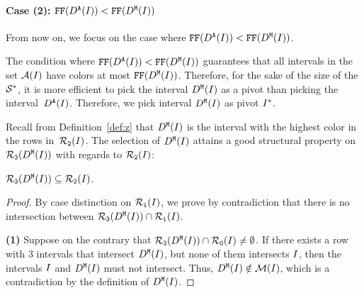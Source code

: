 {

\medskip

\paragraph*{Case (2): $\text{\texttt{FF}}(D^\texttt{A}(I)) < \text{\texttt{FF}}(D^\texttt{M}(I))$}

From now on, we focus on the case where $\text{\texttt{FF}}(D^\texttt{A}(I)) < \text{\texttt{FF}}(D^\texttt{M}(I))$.

\medskip

    The condition where $\text{\texttt{FF}}(D^\texttt{A}(I)) < \text{\texttt{FF}}(D^\texttt{M}(I))$ guarantees that all intervals in the set $\mathcal{A}(I)$ have colors at most $\text{\texttt{FF}}(D^\texttt{M}(I))$.
    Therefore, for the sake of the size of the $\mathcal{S}^*$, it is more efficient to pick the interval $D^\texttt{M}(I)$ as a pivot than picking the interval~$D^\texttt{A}(I)$.
    Therefore, we pick interval $D^\texttt{M}(I)$ as pivot $I^*$.


Recall from Definition~\ref{def:z} that $D^\texttt{M}(I)$ is the interval with the highest color in the rows in~$\mathcal{R}_\texttt{2}(I)$. 
The selection of $D^\texttt{M}(I)$ attains a good structural property on $\mathcal{R}_\texttt{3}(D^\texttt{M}(I))$ with regards to $\mathcal{R}_\texttt{2}(I)$:

\begin{lemma}
    \label{lem:R3z_in_R2x}
    $\mathcal{R}_\texttt{3}(D^\texttt{M}(I)) \subseteq \mathcal{R}_\texttt{2}(I)$.
\end{lemma}

\begin{proof}
    By case distinction on $\mathcal{R}_\texttt{i}(I)$, we prove by contradiction that there is no intersection between $\mathcal{R}_\texttt{3}(D^\texttt{M}(I)) \cap \mathcal{R}_\texttt{i}(I)$.
    
    \textbf{(1)} Suppose on the contrary that $\mathcal{R}_\texttt{3}(D^\texttt{M}(I)) \cap \mathcal{R}_\texttt{0}(I) \neq \emptyset$.
    If there exists a row with $3$ intervals that intersect $D^\texttt{M}(I)$, but none of them intersects $I$, then the intervals $I$ and $D^\texttt{M}(I)$ must not intersect.
    Thus, $D^\texttt{M}(I) \notin \mathcal{M}(I)$, which is a contradiction by the definition of $D^\texttt{M}(I)$.

    \medskip
    

\end{proof}}
